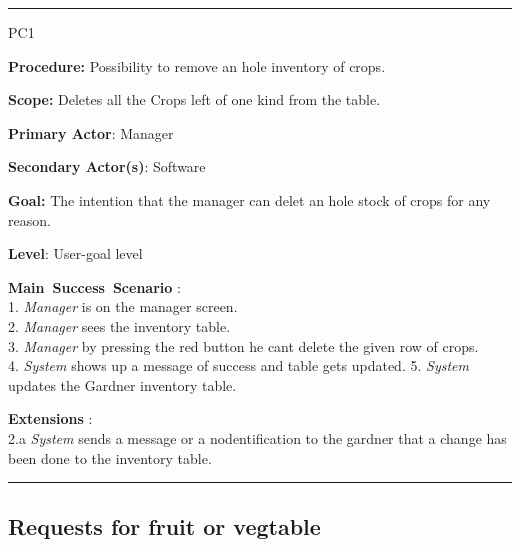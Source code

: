 \vspace{0.5cm}
\hrule
\hfill \break
\begin{lyxlist}{PC1}
\small{
\item [\textbf{Procedure:}] Possibility to remove an hole inventory of crops.
\item [\textbf{Scope:}] Deletes all the Crops left of one kind from the table.
\item [\textbf{Primary Actor}:] Manager
\item [\textbf{Secondary Actor(s)}:] Software
\item [\textbf{Goal:}] The intention that the manager can delet an hole stock of
crops for any reason.
\item [\textbf{Level}:] User-goal level
\item [\textbf{Main~Success~Scenario}]:\\
1. \emph{Manager} is on the manager screen. \\
2. \emph{Manager} sees the inventory table.\\
3. \emph{Manager} by pressing the red button he cant delete the given row of
crops.\\
4. \emph{System} shows up a message of success and table gets updated.
5. \emph{System} updates the Gardner inventory table.
\item [\textbf{Extensions}]:\\
2.a  \emph{System} sends a message or a nodentification to the gardner that a
change has been done to the inventory table.\\
}
\end{lyxlist}
\hrule
\vspace{0.5cm}


\subsection{Requests for fruit or vegtable}


